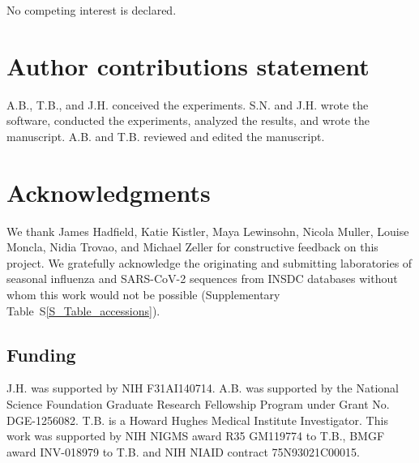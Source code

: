 \documentclass[webpdf,contemporary,large,single]{oup-authoring-template}%
\theoremstyle{thmstyleone}%
\theoremstyle{thmstyletwo}%
\theoremstyle{thmstylethree}%
\begin{document}
No competing interest is declared.

\section*{Author contributions statement}

A.B., T.B., and J.H. conceived the experiments.
S.N. and J.H. wrote the software, conducted the experiments, analyzed the results, and wrote the manuscript.
A.B. and T.B. reviewed and edited the manuscript.

\section*{Acknowledgments}

We thank James Hadfield, Katie Kistler, Maya Lewinsohn, Nicola Muller, Louise Moncla, Nidia Trovao, and Michael Zeller for constructive feedback on this project.
We gratefully acknowledge the originating and submitting laboratories of seasonal influenza and SARS-CoV-2 sequences from INSDC databases without whom this work would not be possible (Supplementary Table~S\ref{S_Table_accessions}).

\subsection*{Funding}

J.H. was supported by NIH F31AI140714.
A.B. was supported by the National Science Foundation Graduate Research Fellowship Program under Grant No.
DGE-1256082.
T.B. is a Howard Hughes Medical Institute Investigator.
This work was supported by NIH NIGMS award R35 GM119774 to T.B., BMGF award INV-018979 to T.B. and NIH NIAID contract 75N93021C00015.

\nolinenumbers





\end{document}
